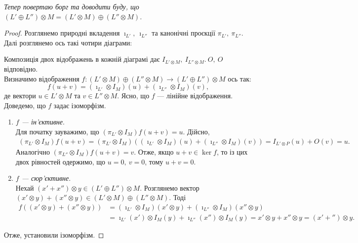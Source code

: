 \documentclass{math_library}
\begin{document}
\textit{Тепер повертаю борг та доводити буду, що $(L' \oplus L'') \otimes M = (L' \otimes M) \oplus (L'' \otimes M)$.}

\begin{proof}
Розглянемо природні вкладення $\imath_{L'},\ \imath_{L''}$ та канонічні проєкції $\pi_{L'},\ \pi_{L''}$. Далі розглянемо ось такі чотири діаграми:
\begin{figure}[H]
\centering
{}
\end{figure}
Композиція двох відображень в кожній діаграмі дає $I_{L' \otimes M},\ I_{L'' \otimes M}.\ O,\ O$ відповідно.\\
Визначимо відображення $f \colon (L' \otimes M) \oplus (L'' \otimes M) \to (L' \oplus L'') \otimes M$ ось так:
\[
f(u + v) = (\imath_{L'} \otimes I_M)(u) + (\imath_{L''} \otimes I_M)(v),
\]
де вектори $u \in L' \otimes M$ та $v \in L'' \otimes M$. Ясно, що $f$ --- лінійне відображення. Доведемо, що $f$ задає ізоморфізм.
\begin{enumerate}[wide=0pt,label={\Roman*.}]
\item \textit{$f$ --- ін'єктивне}.\\
Для початку зауважимо, що $(\pi_{L'} \otimes I_M) f (u+v) = u$. Дійсно,
\begin{align*}
(\pi_{L'} \otimes I_M) f (u+v) = (\pi_{L'} \otimes I_M) ((\imath_{L'} \otimes I_M)(u) + (\imath_{L''} \otimes I_M)(v)) = I_{L' \otimes P}(u) + O(v) = u.
\end{align*}
Аналогічно $(\pi_{L''} \otimes I_M) f (u+v) = v$. Отже, якщо $u+v \in \ker f$, то із цих двох рівностей одержимо, що $u = 0,\ v = 0$, тому $u+v=0$.

\item \textit{$f$ --- сюр'єктивне}.\\
Нехай $(x'+x'') \otimes y \in (L' \oplus L'') \otimes M$. Розглянемо вектор $(x' \otimes y) + (x'' \otimes y) \in (L' \otimes M) \oplus (L'' \otimes M)$. Тоді
\begin{align*}
f((x' \otimes y)+(x'' \otimes y)) & = (\imath_{L'} \otimes I_M)(x' \otimes y) + (\imath_{L''} \otimes I_M)(x'' \otimes y) \\
& = \imath_{L'}(x') \otimes I_M(y) + \imath_{L''}(x'') \otimes I_M(y) = x' \otimes y + x'' \otimes y = (x'+'') \otimes y.
\end{align*}
\end{enumerate}
Отже, установили ізоморфізм.
\end{proof}
\end{document}
